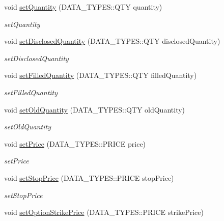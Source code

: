 \begin{DoxyCompactItemize}
void \hyperlink{class_a_p_i2_1_1_single_order_a6b79cf19122fad3d1f5ae3477f4150c0}{set\-Quantity} (D\-A\-T\-A\-\_\-\-T\-Y\-P\-E\-S\-::\-Q\-T\-Y quantity)
\begin{DoxyCompactList}\small\item\em set\-Quantity \end{DoxyCompactList}\item 
void \hyperlink{class_a_p_i2_1_1_single_order_a5b77b15bf65aa531d8144d056767fae0}{set\-Disclosed\-Quantity} (D\-A\-T\-A\-\_\-\-T\-Y\-P\-E\-S\-::\-Q\-T\-Y disclosed\-Quantity)
\begin{DoxyCompactList}\small\item\em set\-Disclosed\-Quantity \end{DoxyCompactList}\item 
void \hyperlink{class_a_p_i2_1_1_single_order_aa968bc7c3f74dd1b4bbf2213bc25e1af}{set\-Filled\-Quantity} (D\-A\-T\-A\-\_\-\-T\-Y\-P\-E\-S\-::\-Q\-T\-Y filled\-Quantity)
\begin{DoxyCompactList}\small\item\em set\-Filled\-Quantity \end{DoxyCompactList}\item 
void \hyperlink{class_a_p_i2_1_1_single_order_ad9b9633dc4513d6d31ed09efec046fa8}{set\-Old\-Quantity} (D\-A\-T\-A\-\_\-\-T\-Y\-P\-E\-S\-::\-Q\-T\-Y old\-Quantity)
\begin{DoxyCompactList}\small\item\em set\-Old\-Quantity \end{DoxyCompactList}\item 
void \hyperlink{class_a_p_i2_1_1_single_order_ac7365ab0c1b59c10c3dfc79366193673}{set\-Price} (D\-A\-T\-A\-\_\-\-T\-Y\-P\-E\-S\-::\-P\-R\-I\-C\-E price)
\begin{DoxyCompactList}\small\item\em set\-Price \end{DoxyCompactList}\item 
void \hyperlink{class_a_p_i2_1_1_single_order_a6828bd5ddd00d5cfe0594afb7b5fbc13}{set\-Stop\-Price} (D\-A\-T\-A\-\_\-\-T\-Y\-P\-E\-S\-::\-P\-R\-I\-C\-E stop\-Price)
\begin{DoxyCompactList}\small\item\em set\-Stop\-Price \end{DoxyCompactList}\item 
void \hyperlink{class_a_p_i2_1_1_single_order_a2c82cc5efa96cc5437c04590427f973e}{set\-Option\-Strike\-Price} (D\-A\-T\-A\-\_\-\-T\-Y\-P\-E\-S\-::\-P\-R\-I\-C\-E strike\-Price)

\end{DoxyCompactItemize}
